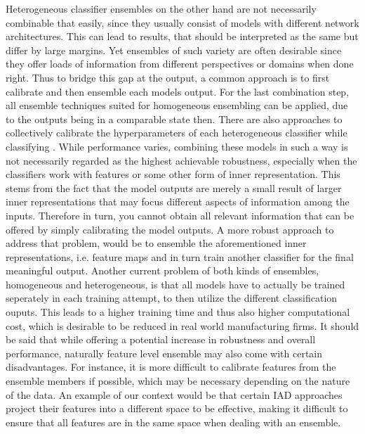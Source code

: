 Heterogeneous classifier ensembles on the other hand are not necessarily combinable that easily, since they usually consist of models with 
different network architectures. This can lead to results, that should be interpreted as the same but differ by large margins. Yet 
ensembles of such variety are often desirable since they offer loads of information from different perspectives or domains when done right. 
\newline
Thus to bridge this gap at the output, a common approach is to first calibrate \cite{Guo_2017_tempscalingetc} and then ensemble each models 
output. For the last combination step, all ensemble techniques suited for homogeneous ensembling can 
be applied, due to the outputs being in a comparable state then. There are also approaches to collectively calibrate the hyperparameters 
of each heterogeneous classifier while classifying \cite{Guo_2017_tempscalingetc}. While performance varies, combining 
these models in such a way is not necessarily regarded as the highest achievable robustness, especially when the classifiers work with features or some other form of inner representation. 
This stems from the fact that the model outputs are merely a small result of larger inner representations that may focus different aspects 
of information among the inputs. Therefore in turn, you cannot obtain all relevant information that can be offered by simply calibrating the 
model outputs. A more robust approach to address that problem, would be to ensemble the aforementioned inner representations, i.e. feature maps 
and in turn train another classifier for the final meaningful output.
\newline
Another current problem of both kinds of ensembles, homogeneous and heterogeneous, is that all models have to actually be trained 
seperately in each training attempt, to then utilize the different classification ouputs. This leads to a higher training time and thus also higher computational 
cost, which is desirable to be reduced in real world manufacturing firms.
It should be said that while offering a potential increase in robustness and overall performance, naturally feature level ensemble may also 
come with certain disadvantages. For instance, it is more difficult to calibrate features from the ensemble members if possible, which may 
be necessary depending on the nature of the data. An example of our context would be that certain IAD approaches project their features into a 
different space to be effective, making it difficult to ensure that all features are in the same space when dealing with an ensemble. 
